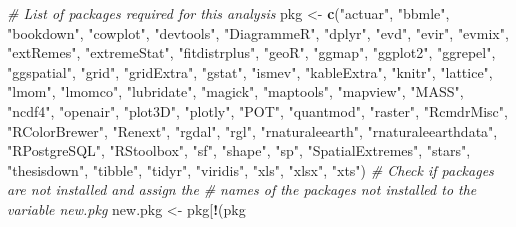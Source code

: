 \documentclass[12pt,oneside]{reedthesis}
\newenvironment{Shaded}{\begin{snugshade}}{\end{snugshade}}
\newcommand{\CommentTok}[1]{\textcolor[rgb]{0.56,0.35,0.01}{\textit{#1}}}
\newcommand{\KeywordTok}[1]{\textcolor[rgb]{0.13,0.29,0.53}{\textbf{#1}}}
\newcommand{\NormalTok}[1]{#1}
\newcommand{\OperatorTok}[1]{\textcolor[rgb]{0.81,0.36,0.00}{\textbf{#1}}}
\newcommand{\StringTok}[1]{\textcolor[rgb]{0.31,0.60,0.02}{#1}}
\begin{document}
\vspace{0.4cm}
\begin{Shaded}
\begin{Highlighting}[]
\CommentTok{# List of packages required for this analysis}
\NormalTok{  pkg <-}\StringTok{ }\KeywordTok{c}\NormalTok{(}\StringTok{"actuar"}\NormalTok{, }\StringTok{"bbmle"}\NormalTok{, }\StringTok{"bookdown"}\NormalTok{, }\StringTok{"cowplot"}\NormalTok{, }\StringTok{"devtools"}\NormalTok{, }\StringTok{"DiagrammeR"}\NormalTok{, }\StringTok{"dplyr"}\NormalTok{, }\StringTok{"evd"}\NormalTok{, }\StringTok{"evir"}\NormalTok{, }\StringTok{"evmix"}\NormalTok{, }\StringTok{"extRemes"}\NormalTok{, }\StringTok{"extremeStat"}\NormalTok{, }
  \StringTok{"fitdistrplus"}\NormalTok{, }\StringTok{"geoR"}\NormalTok{, }\StringTok{"ggmap"}\NormalTok{, }\StringTok{"ggplot2"}\NormalTok{, }\StringTok{"ggrepel"}\NormalTok{, }\StringTok{"ggspatial"}\NormalTok{, }\StringTok{"grid"}\NormalTok{, }\StringTok{"gridExtra"}\NormalTok{, }\StringTok{"gstat"}\NormalTok{, }\StringTok{"ismev"}\NormalTok{, }\StringTok{"kableExtra"}\NormalTok{, }\StringTok{"knitr"}\NormalTok{, }\StringTok{"lattice"}\NormalTok{, }
  \StringTok{"lmom"}\NormalTok{, }\StringTok{"lmomco"}\NormalTok{, }\StringTok{"lubridate"}\NormalTok{, }\StringTok{"magick"}\NormalTok{, }\StringTok{"maptools"}\NormalTok{, }\StringTok{"mapview"}\NormalTok{, }\StringTok{"MASS"}\NormalTok{, }\StringTok{"ncdf4"}\NormalTok{, }\StringTok{"openair"}\NormalTok{, }\StringTok{"plot3D"}\NormalTok{, }\StringTok{"plotly"}\NormalTok{, }\StringTok{"POT"}\NormalTok{, }\StringTok{"quantmod"}\NormalTok{, }\StringTok{"raster"}\NormalTok{, }
  \StringTok{"RcmdrMisc"}\NormalTok{, }\StringTok{"RColorBrewer"}\NormalTok{, }\StringTok{"Renext"}\NormalTok{, }\StringTok{"rgdal"}\NormalTok{, }\StringTok{"rgl"}\NormalTok{, }\StringTok{"rnaturaleearth"}\NormalTok{, }\StringTok{"rnaturaleearthdata"}\NormalTok{, }\StringTok{"RPostgreSQL"}\NormalTok{, }\StringTok{"RStoolbox"}\NormalTok{, }\StringTok{"sf"}\NormalTok{, }\StringTok{"shape"}\NormalTok{, }
  \StringTok{"sp"}\NormalTok{, }\StringTok{"SpatialExtremes"}\NormalTok{, }\StringTok{"stars"}\NormalTok{, }\StringTok{"thesisdown"}\NormalTok{, }\StringTok{"tibble"}\NormalTok{, }\StringTok{"tidyr"}\NormalTok{, }\StringTok{"viridis"}\NormalTok{, }\StringTok{"xls"}\NormalTok{, }\StringTok{"xlsx"}\NormalTok{, }\StringTok{"xts"}\NormalTok{)}
\CommentTok{# Check if packages are not installed and assign the}
\CommentTok{# names of the packages not installed to the variable new.pkg}
\NormalTok{  new.pkg <-}\StringTok{ }\NormalTok{pkg[}\OperatorTok{!}\NormalTok{(pkg }\OperatorTok{%
}
\end{Highlighting}
\end{Shaded}
\end{document}
